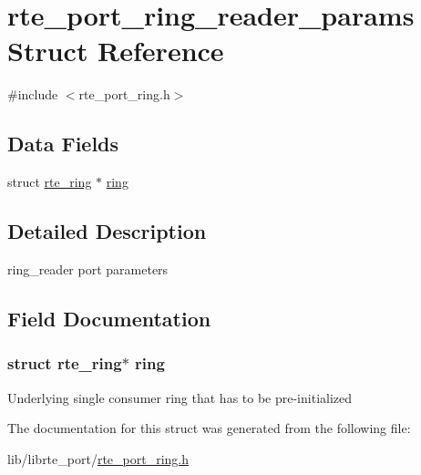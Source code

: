 \hypertarget{structrte__port__ring__reader__params}{}\section{rte\+\_\+port\+\_\+ring\+\_\+reader\+\_\+params Struct Reference}
\label{structrte__port__ring__reader__params}


{\ttfamily \#include $<$rte\+\_\+port\+\_\+ring.\+h$>$}

\subsection*{Data Fields}
\begin{DoxyCompactItemize}
\item 
struct \hyperlink{structrte__ring}{rte\+\_\+ring} $\ast$ \hyperlink{structrte__port__ring__reader__params_a1dfc25cca5a340eff30700b60fd41339}{ring}
\end{DoxyCompactItemize}


\subsection{Detailed Description}
ring\+\_\+reader port parameters 

\subsection{Field Documentation}
\hypertarget{structrte__port__ring__reader__params_a1dfc25cca5a340eff30700b60fd41339}{}
\subsubsection[{ring}]{\setlength{\rightskip}{0pt plus 5cm}struct {\bf rte\+\_\+ring}$\ast$ ring}\label{structrte__port__ring__reader__params_a1dfc25cca5a340eff30700b60fd41339}
Underlying single consumer ring that has to be pre-\/initialized 

The documentation for this struct was generated from the following file\+:\begin{DoxyCompactItemize}
\item 
lib/librte\+\_\+port/\hyperlink{rte__port__ring_8h}{rte\+\_\+port\+\_\+ring.\+h}\end{DoxyCompactItemize}

